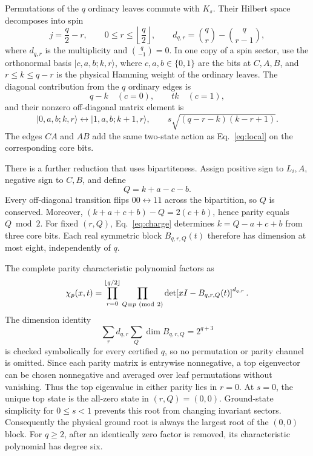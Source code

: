 \documentclass[11pt]{article}
\newcommand{\ket}[1]{\lvert #1\rangle}
\begin{document}
Permutations of the \(q\) ordinary leaves commute with \(K_s\).  Their
Hilbert space decomposes into spin
\begin{equation}
 j=\frac q2-r,\qquad 0\leq r\leq\left\lfloor\frac q2\right\rfloor,
 \qquad
 d_{q,r}=\binom qr-\binom q{r-1},                       \label{eq:spin}
\end{equation}
where \(d_{q,r}\) is the multiplicity and \(\binom q{-1}=0\).  In one
copy of a spin sector, use the orthonormal basis
\(\ket{c,a,b;k,r}\), where \(c,a,b\in\{0,1\}\) are the bits at
\(C,A,B\), and \(r\leq k\leq q-r\) is the physical Hamming weight of
the ordinary leaves.  The diagonal contribution from the \(q\) ordinary
edges is
\begin{equation}
 q-k\quad(c=0),\qquad tk\quad(c=1),                    \label{eq:diag}
\end{equation}
and their nonzero off-diagonal matrix element is
\begin{equation}
 \ket{0,a,b;k,r}\longleftrightarrow\ket{1,a,b;k+1,r},
 \qquad s\sqrt{(q-r-k)(k-r+1)}.                        \label{eq:offdiag}
\end{equation}
The edges \(CA\) and \(AB\) add the same two-state action as
Eq.~\eqref{eq:local} on the corresponding core bits.

There is a further reduction that uses bipartiteness.  Assign positive
sign to \(L_i,A\), negative sign to \(C,B\), and define
\begin{equation}
                 Q=k+a-c-b.                            \label{eq:charge}
\end{equation}
Every off-diagonal transition flips \(00\leftrightarrow11\) across the
bipartition, so \(Q\) is conserved.  Moreover,
\((k+a+c+b)-Q=2(c+b)\), hence parity equals \(Q\bmod2\).  For fixed
\((r,Q)\), Eq.~\eqref{eq:charge} determines
\(k=Q-a+c+b\) from three core bits.  Each real symmetric block
\(B_{q,r,Q}(t)\) therefore has dimension at most eight, independently of
\(q\).

The complete parity characteristic polynomial factors as
\begin{equation}
 \chi_p(x,t)=
 \prod_{r=0}^{\lfloor q/2\rfloor}
 \prod_{Q\equiv p\ ({\rm mod}\ 2)}
 \det\!\left[xI-B_{q,r,Q}(t)\right]^{d_{q,r}}.          \label{eq:factor}
\end{equation}
The dimension identity
\begin{equation}
 \sum_r d_{q,r}\sum_Q\dim B_{q,r,Q}=2^{q+3}            \label{eq:dimension}
\end{equation}
is checked symbolically for every certified \(q\), so no permutation or
parity channel is omitted.  Since each parity matrix is entrywise
nonnegative, a top eigenvector can be chosen nonnegative and averaged over
leaf permutations without vanishing.  Thus the top eigenvalue in either
parity lies in \(r=0\).  At \(s=0\), the unique top state is the all-zero
state in \((r,Q)=(0,0)\).  Ground-state simplicity for \(0\leq s<1\)
prevents this root from changing invariant sectors.  Consequently the
physical ground root is always the largest root of the \((0,0)\) block.
For \(q\geq2\), after an identically zero factor is removed, its
characteristic polynomial has degree six.
\end{document}
